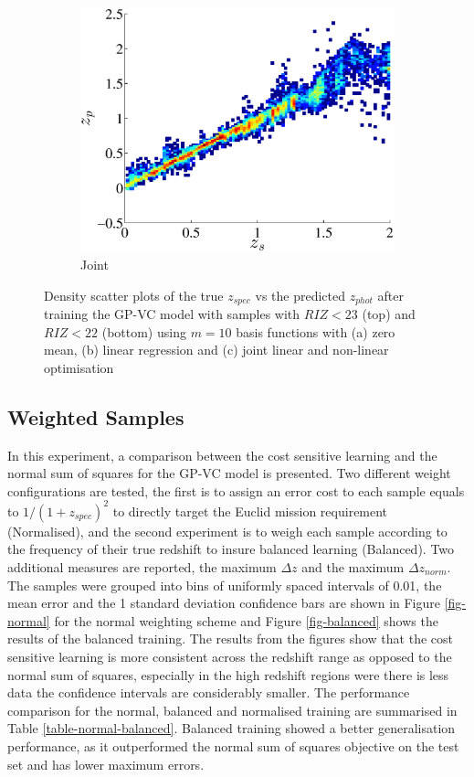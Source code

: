 \documentclass[useAMS,usenatbib,fleqn]{mn2e}
\begin{document}
\begin{figure}
\begin{subfigure}[b]{0.3\columnwidth}
                \includegraphics[width=\textwidth]{figures/22_J.eps}
                \caption{Joint}
        \end{subfigure}
        
        \caption{Density scatter plots of the true $z_{spec}$ vs the predicted $z_{phot}$ after training the GP-VC model with samples with $RIZ<23$ (top) and $RIZ<22$ (bottom) using $m=10$ basis functions with (a) zero mean, (b) linear regression and (c) joint linear and non-linear optimisation}
        \label{fig-RIZ-splits}
\end{figure}


\subsection{Weighted Samples}
In this experiment, a comparison between the cost sensitive learning and the normal sum of squares for the GP-VC model is presented. Two different weight configurations are tested, the first is to assign an error cost to each sample equals to $1/\left(1+z_{spec}\right)^{2}$ to directly target the Euclid mission requirement (Normalised), and the second experiment is to weigh each sample according to the frequency of their true redshift to insure balanced learning (Balanced).  Two additional measures are reported, the maximum $\Delta z$ and the maximum $\Delta z_{norm}$. The samples were grouped into bins of uniformly spaced intervals of 0.01, the mean error and the 1 standard deviation confidence bars are shown in Figure \ref{fig-normal} for the normal weighting scheme and Figure \ref{fig-balanced} shows the results of the balanced training. The results from the figures show that the cost sensitive learning is more consistent across the redshift range as opposed to the normal sum of squares, especially in the high redshift regions were there is less data the confidence intervals are considerably smaller. The performance comparison for the normal, balanced and normalised training are summarised in Table \ref{table-normal-balanced}. Balanced training showed a better generalisation performance, as it outperformed the normal sum of squares objective on the test set and has lower maximum errors.
\end{document}
